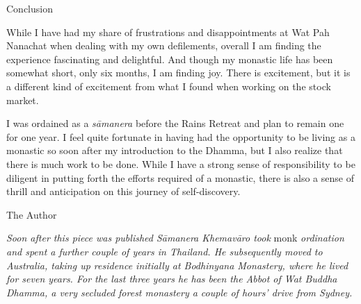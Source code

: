 Conclusion

While I have had my share of frustrations and disappointments at Wat Pah
Nanachat when dealing with my own defilements, overall I am finding the
experience fascinating and delightful. And though my monastic life has
been somewhat short, only six months, I am finding joy. There is
excitement, but it is a different kind of excitement from what I found
when working on the stock market.

I was ordained as a \emph{sāmanera} before the Rains Retreat and plan to
remain one for one year. I feel quite fortunate in having had the
opportunity to be living as a monastic so soon after my introduction to
the Dhamma, but I also realize that there is much work to be done. While
I have a strong sense of responsibility to be diligent in putting forth
the efforts required of a monastic, there is also a sense of thrill and
anticipation on this journey of self-discovery.

The Author

\emph{Soon after this piece was published Sāmanera Khemavāro took} monk
\emph{ordination and spent a further couple of years in Thailand. He
subsequently moved to Australia, taking up residence initially at
Bodhinyana Monastery, where he lived for seven years. For the last three
years he has been the Abbot of Wat Buddha Dhamma, a very secluded forest
monastery a couple of hours' drive from Sydney.}

